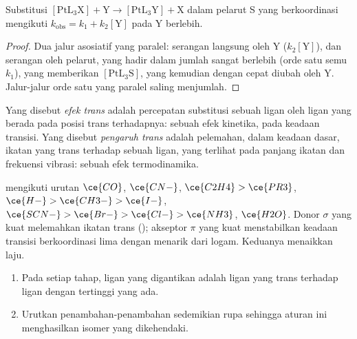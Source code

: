 \begin{proposition}\label{prop:b3:complex-mechanisms:square-planar}
Substitusi $\mathrm{[PtL_3X] + Y \to [PtL_3Y] + X}$ dalam pelarut S yang berkoordinasi mengikuti
$k_{\mathrm{obs}} = k_1 + k_2[\mathrm Y]$ pada Y berlebih.
\end{proposition}

\begin{proof}
Dua jalur asosiatif yang paralel: serangan langsung oleh Y ($k_2[\mathrm Y]$), dan serangan oleh
pelarut, yang hadir dalam jumlah sangat berlebih (orde satu semu $k_1$), yang memberikan $[\mathrm{PtL_3S}]$, yang
kemudian dengan cepat diubah oleh Y. Jalur-jalur orde satu yang paralel saling menjumlah.
\end{proof}

\begin{definition}\label{def:b3:complex-mechanisms:trans-effect}
Yang disebut \emph{efek trans} adalah percepatan substitusi
sebuah ligan oleh ligan yang berada pada posisi trans terhadapnya: sebuah efek kinetika, pada keadaan transisi.
Yang disebut \emph{pengaruh trans} adalah pelemahan, dalam keadaan
dasar, ikatan yang trans terhadap sebuah ligan, yang terlihat pada panjang ikatan dan frekuensi
vibrasi: sebuah efek termodinamika.
\end{definition}

 mengikuti urutan $\ce{CO}$, $\ce{CN-}$, $\ce{C2H4} > \ce{PR3}$, $\ce{H-} > \ce{CH3-} > \ce{I-}$, $\ce{SCN-} >
\ce{Br-} > \ce{Cl-} > \ce{NH3}$, $\ce{H2O}$. Donor $\sigma$ yang kuat melemahkan ikatan trans ();
akseptor $\pi$ yang kuat menstabilkan keadaan transisi berkoordinasi lima dengan menarik
 dari logam. Keduanya menaikkan laju.

\begin{method}\label{met:b3:complex-mechanisms:pt-synthesis}
\begin{enumerate}
  \item Pada setiap tahap, ligan yang digantikan adalah ligan yang trans terhadap ligan
        dengan  tertinggi yang ada.
  \item Urutkan penambahan-penambahan sedemikian rupa sehingga aturan ini menghasilkan isomer yang dikehendaki.
\end{enumerate}
\end{method}

